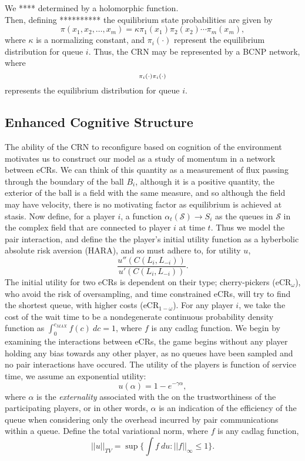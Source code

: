 \documentclass[10pt]{article}
\newcommand{\mcS}{\mathcal{S}}
\theoremstyle{definition}
\begin{document}
We **** determined by a holomorphic function.\\
Then, defining  ********** the equilibrium state probabilities are given by
$$
    \displaystyle \pi (x_{1},x_{2},\ldots ,x_{m}) = \kappa \pi_{1}(x_{1}) \pi _{2}(x_{2})\cdots \pi_{m}(x_{m}),
$$
where $\kappa$ is a normalizing constant, and $\pi_i(\cdot)$ represent the
equilibrium distribution for queue $i$. Thus, the CRN may be represented by a
BCNP network, where
$$
    {\displaystyle \scriptstyle {\pi _{i}(\cdot )}} {\displaystyle \scriptstyle {\pi _{i}(\cdot )}}
$$
represents the equilibrium distribution for queue $i$.



\subsection{Enhanced Cognitive Structure}
The ability of the CRN to reconfigure based on cognition of the environment
motivates us to construct our model as a study of momentum in a network between eCRs. 
We can think of this quantity as a measurement of flux passing through the
boundary of the ball $B_i$, although it is a positive quantity, the exterior of
the ball is a field with the same measure, and so although the field may have
velocity, there is no motivating factor as equilibrium is achieved at stasis.
Now define, for a player $i$, a function
$\alpha_t(\mcS) \longrightarrow S_i$ as the queues in $\mcS$ in the
complex field that are connected to player $i$ at time $t$. 
Thus we model the pair interaction, and define the the player's initial utility
function as a hyberbolic absolute risk aversion (HARA), and so must adhere to,
for utility $u$,
$$
    \displaystyle\frac{u''(C(L_i,L_{-i}))}{u'(C(L_i,L_{-i}))}.
$$
The initial utility for two eCRs is dependent on their type; cherry-pickers
(eCR$_{\omega}$), who
avoid the risk of oversampling, and time constrained eCRs, will try to
find the shortest queue, with higher costs (eCR$_{1-\omega}$).
For any player $i$, we take the cost of the wait time to be a nondegenerate
continuous probability density function as $\int_0^{c_{MAX}} f(c) \  dc = 1$, 
where $f$ is any cadlag function.
We begin by examining the interactions between eCRs, the game begins without any
player holding any bias towards any other player, as no queues have been
sampled and no pair interactions have occured. The utility of the players 
is function of service time, we assume an exponential utility:
$$
    u(\alpha) = 1 - e^{-\gamma \alpha},
$$
where $\alpha$ is the \emph{externality} associated with the on the trustworthiness of the
participating players, or in other words, $\alpha$ is an indication of the
efficiency of the queue when considering only the overhead incurred by pair
communications within a queue. Define the total
variational norm, where $f$ is any cadlag function,
$$
    \vert\vert u\vert\vert_{TV} = \sup\lbrace \int f \ du : \vert\vert
    f\vert\vert_\infty \le 1 \rbrace.
$$
\end{document}
